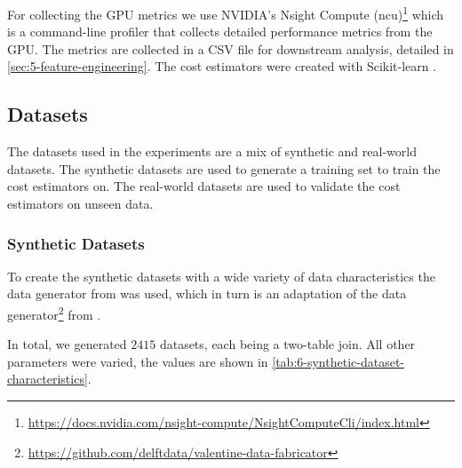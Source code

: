 For collecting the GPU metrics we use NVIDIA's Nsight Compute (ncu)\footnote{\url{https://docs.nvidia.com/nsight-compute/NsightComputeCli/index.html}} which is a command-line profiler that collects detailed performance metrics from the GPU. The metrics are collected in a CSV file for downstream analysis, detailed in \autoref{sec:5-feature-engineering}. The cost estimators were created with Scikit-learn \cite{scikit-learn}.

\subsection{Datasets}
\label{subsec:6-datasets}
The datasets used in the experiments are a mix of synthetic and real-world datasets. The synthetic datasets are used to generate a training set to train the cost estimators on. The real-world datasets are used to validate the cost estimators on unseen data.

\subsubsection{Synthetic Datasets}
To create the synthetic datasets with a wide variety of data characteristics the data generator from \cite{schijndel_cost_estimation} was used, which in turn is an adaptation of the data generator\footnote{\url{https://github.com/delftdata/valentine-data-fabricator}} from \cite{valentine-data-generator}.

In total, we generated $2415$ datasets, each being a two-table join. All other parameters were varied, the values are shown in \autoref{tab:6-synthetic-dataset-characteristics}.


